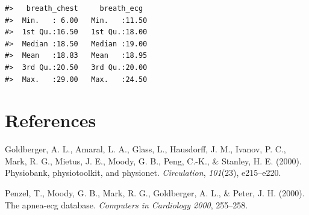 \documentclass[
]{article}
\newlength{\cslhangindent}
\newlength{\cslentryspacingunit} %
\newenvironment{CSLReferences}[2] %
 {%
  \setlength{\parindent}{0pt}
  \ifodd #1
  \let\oldpar\par
  \def\par{\hangindent=\cslhangindent\oldpar}
  \fi
  \setlength{\parskip}{#2\cslentryspacingunit}
 }%
 {}
\begin{document}
\begin{verbatim}
#>   breath_chest     breath_ecg   
#>  Min.   : 6.00   Min.   :11.50  
#>  1st Qu.:16.50   1st Qu.:18.00  
#>  Median :18.50   Median :19.00  
#>  Mean   :18.83   Mean   :18.95  
#>  3rd Qu.:20.50   3rd Qu.:20.00  
#>  Max.   :29.00   Max.   :24.50
\end{verbatim}

\newpage

\hypertarget{references}{%
\section*{References}\label{references}}

\hypertarget{refs}{}
\begin{CSLReferences}{1}{1}
\leavevmode{}%
Goldberger, A. L., Amaral, L. A., Glass, L., Hausdorff, J. M., Ivanov,
P. C., Mark, R. G., Mietus, J. E., Moody, G. B., Peng, C.-K., \&
Stanley, H. E. (2000). Physiobank, physiotoolkit, and physionet.
\emph{Circulation}, \emph{101}(23), e215--e220.

\leavevmode{}%
Penzel, T., Moody, G. B., Mark, R. G., Goldberger, A. L., \& Peter, J.
H. (2000). The apnea-ecg database. \emph{Computers in Cardiology 2000},
255--258.

\end{CSLReferences}
\end{document}
